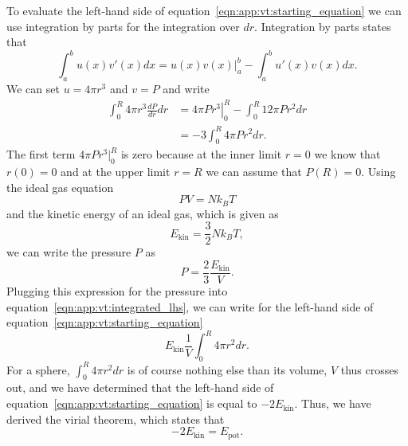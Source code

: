 To evaluate the left-hand side of equation~\eqref{eqn:app:vt:starting_equation} we can use integration by parts for the integration over $dr$. Integration by parts states that
\begin{equation}
    \int_a^b u(x) v'(x) dx = \left.u(x)v(x)\right|_a^b - \int_a^b u'(x) v(x) dx.
\end{equation}
We can set $u=4\pi r^3$ and $v=P$ and write
\begin{equation}
    \begin{aligned}
        \int_0^R 4\pi r^3 \frac{dP}{dr} dr &= \left.4\pi P r^3\right|_0^R - \int_0^R 12\pi P r^2 dr \\
        & = -3 \int_0^R 4\pi P r^2 dr.
    \end{aligned}
    \label{eqn:app:vt:integrated_lhs}
\end{equation}
The first term $4\pi P r^3|_0^R$ is zero because at the inner limit $r=0$ we know that $r(0) = 0$ and at the upper limit $r=R$ we can assume that $P(R) = 0$. Using the ideal gas equation
\begin{equation}
    PV = Nk_BT
\end{equation}
and the kinetic energy of an ideal gas, which is given as
\begin{equation}
    E_\mathrm{kin} = \frac{3}{2} Nk_BT,
\end{equation}
we can write the pressure $P$ as
\begin{equation}
    P = \frac{2}{3} \frac{E_\mathrm{kin}}{V}.
\end{equation}
Plugging this expression for the pressure into equation~\eqref{eqn:app:vt:integrated_lhs}, we can write for the left-hand side of equation~\ref{eqn:app:vt:starting_equation}
\begin{equation}
    E_\mathrm{kin} \frac{1}{V} \int_0^R 4\pi r^2 dr.
\end{equation}
For a sphere, $\int_0^R 4\pi r^2 dr$ is of course nothing else than its volume, $V$ thus crosses out, and we have determined that the left-hand side of equation~\eqref{eqn:app:vt:starting_equation} is equal to $-2E_\mathrm{kin}$.
Thus, we have derived the virial theorem, which states that
\begin{equation}
    -2E_\mathrm{kin} = E_\mathrm{pot}. 
\end{equation}

